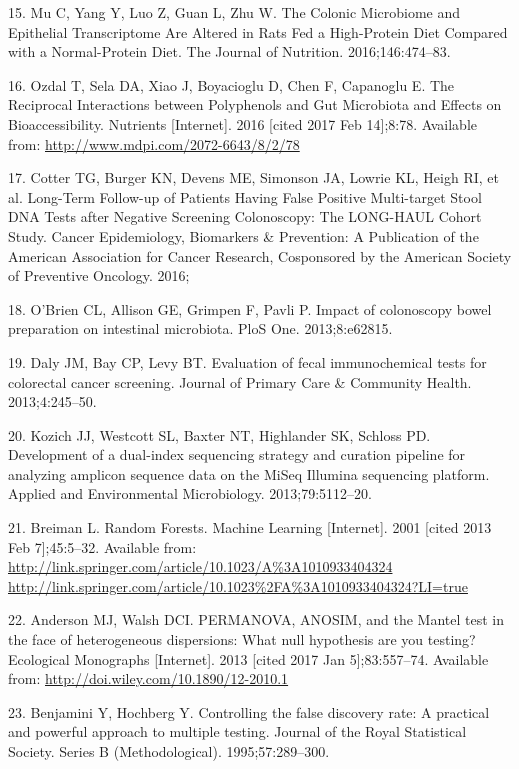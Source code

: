 \documentclass[12pt,]{article}
\begin{document}
\hypertarget{ref-mu_colonic_2016}{}
15. Mu C, Yang Y, Luo Z, Guan L, Zhu W. The Colonic Microbiome and
Epithelial Transcriptome Are Altered in Rats Fed a High-Protein Diet
Compared with a Normal-Protein Diet. The Journal of Nutrition.
2016;146:474--83.

\hypertarget{ref-ozdal_reciprocal_2016}{}
16. Ozdal T, Sela DA, Xiao J, Boyacioglu D, Chen F, Capanoglu E. The
Reciprocal Interactions between Polyphenols and Gut Microbiota and
Effects on Bioaccessibility. Nutrients {[}Internet{]}. 2016 {[}cited
2017 Feb 14{]};8:78. Available from:
\url{http://www.mdpi.com/2072-6643/8/2/78}

\hypertarget{ref-cotter_long-term_2016}{}
17. Cotter TG, Burger KN, Devens ME, Simonson JA, Lowrie KL, Heigh RI,
et al. Long-Term Follow-up of Patients Having False Positive
Multi-target Stool DNA Tests after Negative Screening Colonoscopy: The
LONG-HAUL Cohort Study. Cancer Epidemiology, Biomarkers \& Prevention: A
Publication of the American Association for Cancer Research, Cosponsored
by the American Society of Preventive Oncology. 2016;

\hypertarget{ref-obrien_impact_2013}{}
18. O'Brien CL, Allison GE, Grimpen F, Pavli P. Impact of colonoscopy
bowel preparation on intestinal microbiota. PloS One. 2013;8:e62815.

\hypertarget{ref-daly_evaluation_2013}{}
19. Daly JM, Bay CP, Levy BT. Evaluation of fecal immunochemical tests
for colorectal cancer screening. Journal of Primary Care \& Community
Health. 2013;4:245--50.

\hypertarget{ref-kozich_development_2013}{}
20. Kozich JJ, Westcott SL, Baxter NT, Highlander SK, Schloss PD.
Development of a dual-index sequencing strategy and curation pipeline
for analyzing amplicon sequence data on the MiSeq Illumina sequencing
platform. Applied and Environmental Microbiology. 2013;79:5112--20.

\hypertarget{ref-breiman_random_2001}{}
21. Breiman L. Random Forests. Machine Learning {[}Internet{]}. 2001
{[}cited 2013 Feb 7{]};45:5--32. Available from:
\href{http://link.springer.com/article/10.1023/A\%3A1010933404324\%20http://link.springer.com/article/10.1023\%2FA\%3A1010933404324?LI=true}{http://link.springer.com/article/10.1023/A\%3A1010933404324 http://link.springer.com/article/10.1023\%2FA\%3A1010933404324?LI=true}

\hypertarget{ref-anderson_permanova_2013}{}
22. Anderson MJ, Walsh DCI. PERMANOVA, ANOSIM, and the Mantel test in
the face of heterogeneous dispersions: What null hypothesis are you
testing? Ecological Monographs {[}Internet{]}. 2013 {[}cited 2017 Jan
5{]};83:557--74. Available from:
\url{http://doi.wiley.com/10.1890/12-2010.1}

\hypertarget{ref-benjamini_controlling_1995}{}
23. Benjamini Y, Hochberg Y. Controlling the false discovery rate: A
practical and powerful approach to multiple testing. Journal of the
Royal Statistical Society. Series B (Methodological). 1995;57:289--300.
\end{document}
